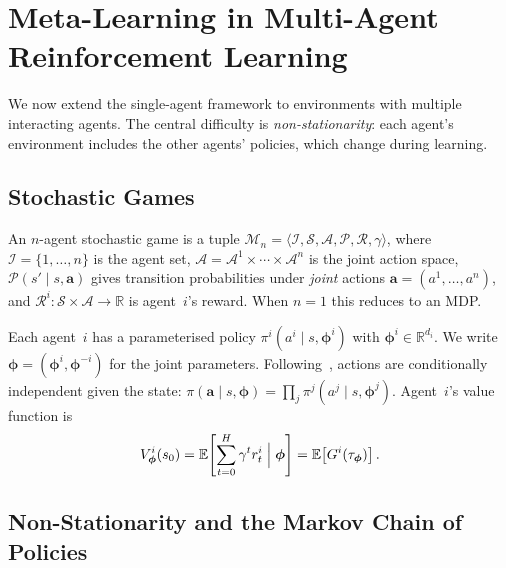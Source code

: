 
\chapter{Meta-Learning in Multi-Agent Reinforcement Learning}
\label{ch:meta-learning}

We now extend the single-agent framework to environments with multiple interacting agents. The central difficulty is \emph{non-stationarity}: each agent's environment includes the other agents' policies, which change during learning.

\section{Stochastic Games}
\label{sec:stochastic-games}

\begin{definition}\label{def:stochastic-game}
An $n$-agent stochastic game is a tuple $\mathcal{M}_n = \langle \mathcal{I},\mathcal{S},\bm{\mathcal{A}},\mathcal{P},\bm{\mathcal{R}},\gamma\rangle$, where $\mathcal{I}=\{1,\ldots,n\}$ is the agent set, $\bm{\mathcal{A}}=\mathcal{A}^1\times\cdots\times\mathcal{A}^n$ is the joint action space, $\mathcal{P}(s'\mid s,\bm{a})$ gives transition probabilities under \emph{joint} actions $\bm{a}=(a^1,\ldots,a^n)$, and $\mathcal{R}^i\colon\mathcal{S}\times\bm{\mathcal{A}}\to\mathbb{R}$ is agent~$i$'s reward. When $n=1$ this reduces to an MDP.
\end{definition}

Each agent~$i$ has a parameterised policy $\pi^i(a^i\mid s,\bm{\phi}^i)$ with $\bm{\phi}^i\in\mathbb{R}^{d_i}$. We write $\bm{\phi}=(\bm{\phi}^i,\bm{\phi}^{-i})$ for the joint parameters. Following~\cite{wen2019}, actions are conditionally independent given the state: $\pi(\bm{a}\mid s,\bm{\phi})=\prod_j\pi^j(a^j\mid s,\bm{\phi}^j)$. Agent~$i$'s value function is
\begin{equation}\label{eq:multi-agent-value}
  V^i_{\bm{\phi}}(s_0) = \mathbb{E}\!\left[\sum_{t=0}^H\gamma^t r_t^i\;\Big|\;\bm{\phi}\right] = \mathbb{E}\!\left[G^i(\tau_{\bm{\phi}})\right].
\end{equation}

\section{Non-Stationarity and the Markov Chain of Policies}
\label{sec:non-stationarity}

